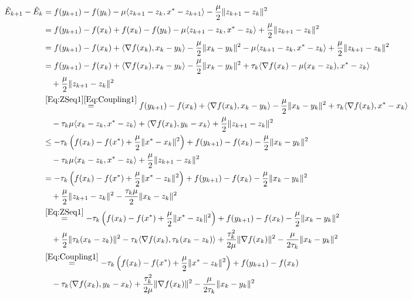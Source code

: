 \documentclass[11pt]{article}
\theoremstyle{plain}
\begin{document}
\begin{align*}
\tilde E_{k+1} -\tilde  E_k &= f(y_{k+1}) - f(y_k) - \mu \langle z_{k+1} - z_k, x^\ast - z_{k+1}\rangle - \frac{\mu}{2}\|z_{k+1} - z_k\|^2\\
&= f(y_{k+1}) - f(x_k) + f(x_k) - f(y_k) - \mu \langle z_{k+1} - z_k, x^\ast - z_{k}\rangle + \frac{\mu}{2}\|z_{k+1} - z_k\|^2\\
&= f(y_{k+1}) - f(x_k) + \langle \nabla f(x_k), x_k - y_k\rangle - \frac{\mu}{2}\|x_k - y_k\|^2 - \mu \langle z_{k+1} - z_k, x^\ast - z_{k}\rangle + \frac{\mu}{2}\|z_{k+1} - z_k\|^2\\
&= f(y_{k+1}) - f(x_k) + \langle \nabla f(x_k), x_k - y_k\rangle - \frac{\mu}{2}\|x_k - y_k\|^2 + \tau_k \langle \nabla f(x_{k}) - \mu(x_{k} - z_k), x^\ast - z_{k}\rangle \\
&\quad + \frac{\mu}{2}\|z_{k+1} - z_k\|^2\\
&\overset{\eqref{Eq:ZSeq1}\eqref{Eq:Coupling1}}{=} f(y_{k+1})- f(x_k) + \langle \nabla f(x_k), x_k - y_k\rangle - \frac{\mu}{2}\|x_k - y_k\|^2 + \tau_k \langle \nabla f(x_{k}), x^\ast - x_{k} \rangle\\
&\quad   - \tau_k\mu\langle x_{k} - z_k, x^\ast - z_{k}\rangle + \langle\nabla f(x_{k}), y_{k} - x_{k}\rangle + \frac{\mu}{2}\|z_{k+1} - z_k\|^2\\
%
&\leq -\tau_k\left( f(x_{k} ) - f(x^\ast) + \frac{\mu}{2}\|x^\ast - x_{k}\|^2 \right) + f(y_{k+1}) - f(x_k)  - \frac{\mu}{2}\|x_k - y_k\|^2   \\
&\quad - \tau_k\mu\langle x_{k} - z_k, x^\ast - z_{k}\rangle  + \frac{\mu}{2}\|z_{k+1} - z_k\|^2\\
&= -\tau_k\left( f(x_{k} ) - f(x^\ast) + \frac{\mu}{2}\|x^\ast - z_k\|^2 \right) + f(y_{k+1}) - f(x_k)  - \frac{\mu}{2}\|x_k - y_k\|^2  \\
&\quad   + \frac{\mu}{2}\|z_{k+1} - z_k\|^2 -\frac{\tau_k\mu}{2}\|x_k - z_k\|^2\\
&\overset{\eqref{Eq:ZSeq1}}{=} -\tau_k\left( f(x_k ) - f(x^\ast) + \frac{\mu}{2}\|x^\ast - z_k\|^2 \right) + f(y_{k+1}) - f(x_k)- \frac{\mu}{2}\|x_k - y_k\|^2\\
&\quad    + \frac{\mu}{2}\|\tau_k(x_{k} - z_k)\|^2 - \tau_k \langle \nabla f(x_{k}), \tau_k(x_{k} - z_k)\rangle + \frac{\tau_k^2}{2\mu}\|\nabla f(x_{k})\|^2-\frac{\mu}{2\tau_k}\|x_k - y_k\|^2\\
&\overset{\eqref{Eq:Coupling1}}{=} -\tau_k\left( f(x_k ) - f(x^\ast) + \frac{\mu}{2}\|x^\ast - z_k\|^2 \right) + f(y_{k+1}) - f(x_k)  \\
&\quad    - \tau_k \langle \nabla f(x_{k}), y_k - x_k\rangle + \frac{\tau_k^2}{2\mu}\|\nabla f(x_{k})\|^2 -\frac{\mu}{2\tau_k}\|x_k - y_k\|^2\\

\end{align*}
\end{document}
